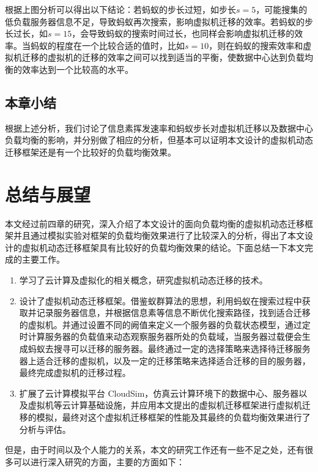 根据上图分析可以得出以下结论：若蚂蚁的步长过短，如步长$ s = 5$，可能搜集的低负载服务器信息不足，导致蚂蚁再次搜索，影响虚拟机迁移的效率。若蚂蚁的步长过长，如$ s = 15 $，会导致蚂蚁的搜索时间过长，也同样会影响虚拟机迁移的效率。当蚂蚁的程度在一个比较合适的值时，比如$ s = 10 $，则在蚂蚁的搜索效率和虚拟机迁移的虚拟机的迁移的效率之间可以找到适当的平衡，使数据中心达到负载均衡的效率达到一个比较高的水平。

 \section{本章小结}
根据上述分析，我们讨论了信息素挥发速率和蚂蚁步长对虚拟机迁移以及数据中心负载均衡的影响，并分别做了相应的分析，但基本可以证明本文设计的虚拟机动态迁移框架还是有一个比较好的负载均衡效果。

\chapter{总结与展望}
本文经过前四章的研究，深入介绍了本文设计的面向负载均衡的虚拟机动态迁移框架并且通过模拟实验对框架的负载均衡效果进行了比较深入的分析，得出了本文设计的虚拟机动态迁移框架具有比较好的负载均衡效果的结论。下面总结一下本文完成的主要工作。

\begin{enumerate}
    \item 学习了云计算及虚拟化的相关概念，研究虚拟机动态迁移的技术。
    \item 设计了虚拟机动态迁移框架。借鉴蚁群算法的思想，利用蚂蚁在搜索过程中获取并记录服务器信息，并根据信息素等信息不断优化搜索路径，找到适合迁移的虚拟机。并通过设置不同的阙值来定义一个服务器的负载状态模型，通过定时计算服务器的负载值来动态观察服务器所处的负载域，当服务器过载便会生成蚂蚁去搜寻可以迁移的服务器。最终通过一定的选择策略来选择待迁移服务器上适合迁移的虚拟机，以及一定的迁移策略来选择适合迁移的目的服务器，最终完成虚拟机的迁移过程。
    \item 扩展了云计算模拟平台 CloudSim，仿真云计算环境下的数据中心、服务器以及虚拟机等云计算基础设施，并应用本文提出的虚拟机迁移框架进行虚拟机迁移的模拟，最终对这个虚拟机迁移框架的性能及其最终的负载均衡效果进行了分析与评估。
\end{enumerate}

但是，由于时间以及个人能力的关系，本文的研究工作还有一些不足之处，还有很多可以进行深入研究的方面，主要的方面如下：

